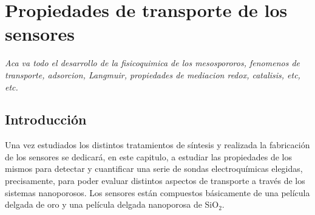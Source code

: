  \newcommand{\NoBiblioEQ}[1]{
 \ifthenelse{\equal{#1}{verdadero}}{}{}
 \NoBiblioEQ{verdadero}}


 \FormatoCapituloDosLineas
 
 \chapter{Propiedades de transporte de los sensores}
 \label{chap:Electroquimica}

 \thispagestyle{empty}
	
 \noindent\textit{Aca va todo el desarrollo de la fisicoquimica de los mesospororos, fenomenos de  transporte, adsorcion, Langmuir, propiedades de mediacion redox, catalisis, etc, etc.}

 \vfill
 \minitoc
 \newpage

\section{Introducción}

	Una vez estudiados los distintos tratamientos de síntesis y realizada la fabricación de los sensores se dedicará, en este capitulo, a estudiar las propiedades de los mismos para detectar y cuantificar una serie de sondas electroquímicas elegidas, precisamente, para poder evaluar distintos aspectos de transporte a través de los sistemas nanoporosos. 
	Los sensores están compuestos básicamente de una película delgada de oro y una película delgada nanoporosa de SiO$_2$. 

